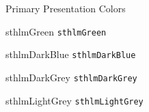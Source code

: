 \documentclass[compress]{beamer}
\begin{document}
\begin{frame}{Primary Presentation Colors}
\begin{multicols}{2}
		\begin{beamercolorbox}[wd=\linewidth,ht=2ex,dp=0.7ex]{sthlmGreen}
			\texttt{sthlmGreen}
		\end{beamercolorbox}
		
		\begin{beamercolorbox}[wd=\linewidth,ht=2ex,dp=0.7ex]{sthlmDarkBlue}
			\texttt{sthlmDarkBlue}
		\end{beamercolorbox}
		
		\begin{beamercolorbox}[wd=\linewidth,ht=2ex,dp=0.7ex]{sthlmDarkGrey}
			\texttt{sthlmDarkGrey}
		\end{beamercolorbox}
		
		\begin{beamercolorbox}[wd=\linewidth,ht=2ex,dp=0.7ex]{sthlmLightGrey}
			\texttt{sthlmLightGrey}
		\end{beamercolorbox}
		
	\end{multicols}
\end{frame}

\end{document}
